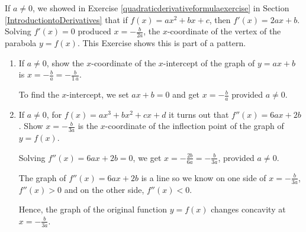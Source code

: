 \documentclass{ximera}
\begin{document}
\begin{problem}
If $a \neq 0$, we showed in Exercise \ref{quadraticderivativeformulaexercise} in Section \ref{IntroductiontoDerivatives} that if $f(x) = ax^2 + bx + c$, then $f'(x) = 2ax + b$. Solving $f'(x) = 0$ produced $x = -\frac{b}{2a}$, the $x$-coordinate of the vertex of the parabola $y = f(x)$. This Exercise shows this is part of a pattern.

\begin{enumerate}  \item  If $a \neq 0$, show the $x$-coordinate of the $x$-intercept of the graph of $y = ax + b$ is $x = -\frac{b}{a} = -\frac{b}{1 \, a}$.

\begin{solution}
To find the $x$-intercept, we set $ax+b = 0$  and get $x = -\frac{b}{a}$ provided $a \neq 0$.
\end{solution}

\item  If $a \neq 0$, for $f(x) = ax^3 + bx^2 + cx + d$ it turns out that $f''(x) = 6ax + 2b$.  Show $x = -\frac{b}{3a}$ is the $x$-coordinate of the inflection point of the graph of $y = f(x)$.

\begin{solution}
Solving  $f''(x) = 6ax + 2b = 0$, we get $x = -\frac{2b}{6a} = - \frac{b}{3a}$, provided $a \neq 0$.  

The graph of $f''(x) =  6ax + 2b$ is a line so we know on one side of $x= - \frac{b}{3a}$, $f''(x) > 0$ and on the other side, $f''(x) < 0$.  

Hence, the graph of the original function $y = f(x)$ changes concavity at $x = -\frac{b}{3a}$.

\end{solution}
\end{enumerate}
\end{problem}
\end{document}
